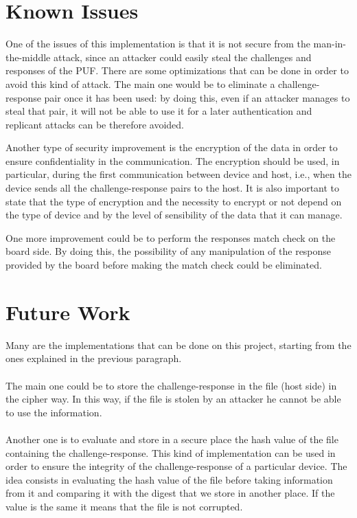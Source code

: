 \section{Known Issues}
One of the issues of this implementation is that it is not secure from the man-in-the-middle attack, since an attacker could easily steal the challenges and responses of the PUF.
There are some optimizations that can be done in order to avoid this kind of attack.
The main one would be to eliminate a challenge-response pair once it has been used: by doing this, even if an attacker manages to steal that pair, it will not be able to use it for a later authentication and replicant attacks can be therefore avoided.

Another type of security improvement is the encryption of the data in order to ensure confidentiality in the communication. The encryption should be used, in particular, during the first communication between device and host, i.e., when the device sends all the challenge-response pairs to the host.
It is also important to state that the type of encryption and the necessity to encrypt or not depend on the type of device and by the level of sensibility of the data that it can manage.

One more improvement could be to perform the responses match check on the board side. By doing this, the possibility of any manipulation of the response provided by the board before making the match check could be eliminated.


\section{Future Work}
Many are the implementations that can be done on this project, starting from the ones explained in the previous paragraph.
\\
\\
The main one could be to store the challenge-response in the file (host side) in the cipher way. In this way, if the file is stolen by an attacker he cannot be able to use the information.
\\
\\
Another one is to evaluate and store in a secure place the hash value of the file containing the challenge-response.
This kind of implementation can be used in order to ensure the integrity of the challenge-response of a particular device.
The idea consists in evaluating the hash value of the file before taking information from it and comparing it with the digest that we store in another place.
If the value is the same it means that the file is not corrupted.



